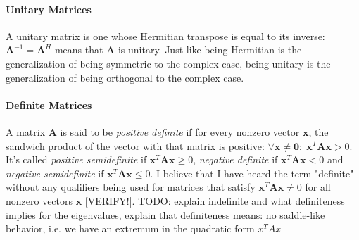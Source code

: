 



\paragraph{Unitary Matrices}
A unitary matrix is one whose Hermitian transpose is equal to its inverse: $\mathbf{A}^{-1} = \mathbf{A}^H$ means that $\mathbf{A}$ is unitary. Just like being Hermitian is the generalization of being symmetric to the complex case, being unitary is the generalization of being orthogonal to the complex case.




\paragraph{Definite Matrices}
A matrix $\mathbf{A}$ is said to be \emph{positive definite} if for every nonzero vector $\mathbf{x}$, the sandwich product of the vector with that matrix is positive: $\forall \mathbf{x \neq 0}: \; \mathbf{x}^T \mathbf{A x} > 0$. It's called \emph{positive semidefinite} if $\mathbf{x}^T \mathbf{A x} \geq 0$, \emph{negative definite} if $\mathbf{x}^T \mathbf{A x} < 0$ and \emph{negative semidefinite} if $\mathbf{x}^T \mathbf{A x} \leq 0$. I believe that I have heard the term "definite" without any qualifiers being used for matrices that satisfy $\mathbf{x}^T \mathbf{A x} \neq 0$ for all nonzero vectors $\mathbf{x}$ [VERIFY!]. TODO: explain indefinite and what definiteness implies for the eigenvalues, explain that definiteness means: no saddle-like behavior, i.e. we have an extremum in the quadratic form  $x^T A x$



